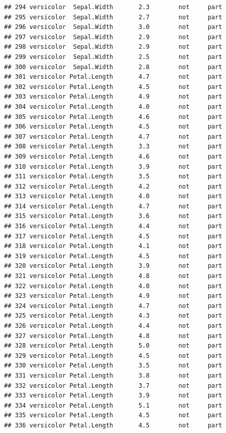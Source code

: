 \documentclass[krantz2]{krantz}\usepackage{knitr}%
\begin{document}
\begin{knitrout}
\begin{kframe}
\begin{verbatim}
## 294 versicolor  Sepal.Width       2.3        not     part
## 295 versicolor  Sepal.Width       2.7        not     part
## 296 versicolor  Sepal.Width       3.0        not     part
## 297 versicolor  Sepal.Width       2.9        not     part
## 298 versicolor  Sepal.Width       2.9        not     part
## 299 versicolor  Sepal.Width       2.5        not     part
## 300 versicolor  Sepal.Width       2.8        not     part
## 301 versicolor Petal.Length       4.7        not     part
## 302 versicolor Petal.Length       4.5        not     part
## 303 versicolor Petal.Length       4.9        not     part
## 304 versicolor Petal.Length       4.0        not     part
## 305 versicolor Petal.Length       4.6        not     part
## 306 versicolor Petal.Length       4.5        not     part
## 307 versicolor Petal.Length       4.7        not     part
## 308 versicolor Petal.Length       3.3        not     part
## 309 versicolor Petal.Length       4.6        not     part
## 310 versicolor Petal.Length       3.9        not     part
## 311 versicolor Petal.Length       3.5        not     part
## 312 versicolor Petal.Length       4.2        not     part
## 313 versicolor Petal.Length       4.0        not     part
## 314 versicolor Petal.Length       4.7        not     part
## 315 versicolor Petal.Length       3.6        not     part
## 316 versicolor Petal.Length       4.4        not     part
## 317 versicolor Petal.Length       4.5        not     part
## 318 versicolor Petal.Length       4.1        not     part
## 319 versicolor Petal.Length       4.5        not     part
## 320 versicolor Petal.Length       3.9        not     part
## 321 versicolor Petal.Length       4.8        not     part
## 322 versicolor Petal.Length       4.0        not     part
## 323 versicolor Petal.Length       4.9        not     part
## 324 versicolor Petal.Length       4.7        not     part
## 325 versicolor Petal.Length       4.3        not     part
## 326 versicolor Petal.Length       4.4        not     part
## 327 versicolor Petal.Length       4.8        not     part
## 328 versicolor Petal.Length       5.0        not     part
## 329 versicolor Petal.Length       4.5        not     part
## 330 versicolor Petal.Length       3.5        not     part
## 331 versicolor Petal.Length       3.8        not     part
## 332 versicolor Petal.Length       3.7        not     part
## 333 versicolor Petal.Length       3.9        not     part
## 334 versicolor Petal.Length       5.1        not     part
## 335 versicolor Petal.Length       4.5        not     part
## 336 versicolor Petal.Length       4.5        not     part

\end{verbatim}
\end{kframe}
\end{knitrout}
\end{document}
